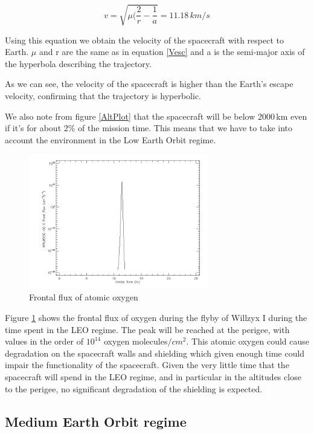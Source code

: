 \begin{equation}
v=\sqrt{\mu(\frac{2}{r}-\frac{1}{a}}=11.18\,km/s
\label{Vsc}
\end{equation}

Using this equation we obtain the velocity of the spacecraft with respect to Earth. $\mu$ and r are the same as in equation \ref{Vesc} and a is the semi-major axis of the hyperbola describing the trajectory.

As we can see, the velocity of the spacecraft is higher than the Earth's escape velocity, confirming that the trajectory is hyperbolic.

We also note from figure \ref{AltPlot} that the spacecraft will be below 2000\,km even if it's for about 2\% of the mission time. This means that we have to take into account the environment in the Low Earth Orbit regime.

\begin{figure}[h!]
\centering
\includegraphics[width=0.7\textwidth]{figures/OxTime.png}
\caption{Frontal flux of atomic oxygen}
\label{Oxygen}
\end{figure}

Figure \ref{Oxygen} shows the frontal flux of oxygen during the flyby of Willzyx I during the time spent in the LEO regime. The peak will be reached at the perigee, with values in the order of $10^{14}$ oxygen molecules$/cm^2$. This atomic oxygen could cause degradation on the spacecraft walls and shielding which given enough time could impair the functionality of the spacecraft. Given the very little time that the spacecraft will spend in the LEO regime, and in particular in the altitudes close to the perigee, no significant degradation of the shielding is expected.

\subsection{Medium Earth Orbit regime}

